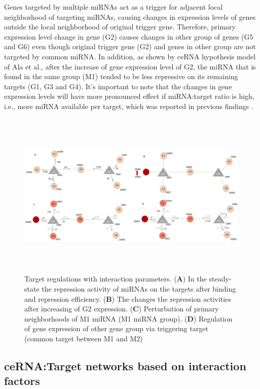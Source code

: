 \documentclass[a4,center,fleqn]{NAR}
\begin{document}
Genes targeted by multiple miRNAs act as a trigger for adjacent local
neighborhood of targeting miRNAs, causing changes in expression levels
of genes outside the local neighborhood of original trigger gene.
Therefore, primary expression level change in gene (G2) causes changes
in other group of genes (G5 and G6) even though original trigger gene
(G2) and genes in other group are not targeted by common miRNA. In
addition, as shown by ceRNA hypothesis model of Ala et al., after the
increase of gene expression level of G2, the miRNA that is found in the
same group (M1) tended to be less repressive on its remaining targets
(G1, G3 and G4). It's important to note that the changes in gene
expression levels will have more pronounced effect if miRNA:target ratio
is high, i.e., more miRNA available per target, which was reported in
previous findings
\citep{arvey_target_2010, bosson_endogenous_2014, denzler_assessing_2014}.

\begin{figure}[ht]
\begin{center}
\includegraphics[width=15cm,height=8cm]{Fig3.eps}
\end{center}
\caption{Target regulations with interaction parameters. 
     (\textbf{A}) In the steady-state the repression activity of miRNAs on the targets after binding and repression efficiency. 
     (\textbf{B}) The changes the repression activities after increasing of G2 expression. 
     (\textbf{C}) Perturbation of primary neighborhoods of M1 miRNA (M1 miRNA group). 
     (\textbf{D}) Regulation of gene expression of other gene group via triggering target (common target between M1 and M2)}
\label{fig:fig3}
\end{figure}

\subsection{ceRNA:Target networks based on interaction factors}
\end{document}
